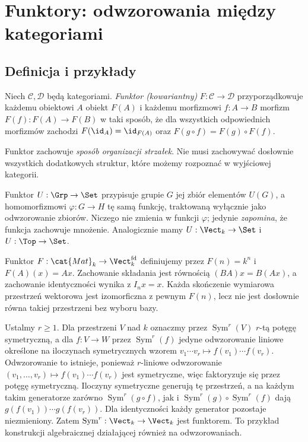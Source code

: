 \providecommand{\atlasref}[2]{#2}
\section{Funktory: odwzorowania między kategoriami}\label{sec:funktory}

\subsection{Definicja i przykłady}

\begin{definicja}\label{def:funktor}
Niech $\mathcal C,\mathcal D$ będą kategoriami. \emph{Funktor (kowariantny)} $F:\mathcal C\to\mathcal D$ przyporządkowuje każdemu obiektowi $A$ obiekt $F(A)$ i każdemu morfizmowi $f:A\to B$ morfizm $F(f):F(A)\to F(B)$ w taki sposób, że dla wszystkich odpowiednich morfizmów zachodzi $F(\id_A)=\id_{F(A)}$ oraz $F(g\circ f)=F(g)\circ F(f)$.
\end{definicja}

Funktor zachowuje \emph{sposób organizacji strzałek}. Nie musi zachowywać dosłownie wszystkich dodatkowych struktur, które możemy rozpoznać w wyjściowej kategorii.

\begin{przyklad}
Funktor $U:\Grp\to\Set$ przypisuje grupie $G$ jej zbiór elementów $U(G)$, a homomorfizmowi $\varphi:G\to H$ tę samą funkcję, traktowaną wyłącznie jako odwzorowanie zbiorów. Niczego nie zmienia w funkcji $\varphi$; jedynie \emph{zapomina}, że funkcja zachowuje mnożenie. Analogicznie mamy $U:\Vect_k\to\Set$ i $U:\Top\to\Set$.
\end{przyklad}

\begin{przyklad}
Funktor $F:\cat{Mat}_k\to\Vect_k^{\mathrm{fd}}$ definiujemy przez $F(n)=k^n$ i $F(A)(x)=Ax$. Zachowanie składania jest równością $(BA)x=B(Ax)$, a zachowanie identyczności wynika z $I_nx=x$. Każda skończenie wymiarowa przestrzeń wektorowa jest izomorficzna z pewnym $F(n)$, lecz nie jest dosłownie równa takiej przestrzeni bez wyboru bazy.
\end{przyklad}

\begin{przyklad}
Ustalmy $r\geq1$. Dla przestrzeni $V$ nad $k$ oznaczmy przez $\operatorname{Sym}^r(V)$ $r$-tą potęgę symetryczną, a dla $f:V\to W$ przez $\operatorname{Sym}^r(f)$ jedyne odwzorowanie liniowe określone na iloczynach symetrycznych wzorem $v_1\cdots v_r\mapsto f(v_1)\cdots f(v_r)$. Odwzorowanie to istnieje, ponieważ $r$-liniowe odwzorowanie $(v_1,\ldots,v_r)\mapsto f(v_1)\cdots f(v_r)$ jest symetryczne, więc faktoryzuje się przez potęgę symetryczną. Iloczyny symetryczne generują tę przestrzeń, a na każdym takim generatorze zarówno $\operatorname{Sym}^r(g\circ f)$, jak i $\operatorname{Sym}^r(g)\circ\operatorname{Sym}^r(f)$ dają $g(f(v_1))\cdots g(f(v_r))$. Dla identyczności każdy generator pozostaje niezmieniony. Zatem $\operatorname{Sym}^r:\Vect_k\to\Vect_k$ jest funktorem. To przykład konstrukcji algebraicznej działającej również na odwzorowaniach.
\end{przyklad}

